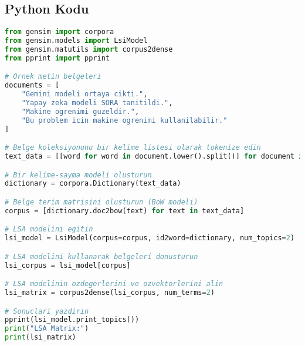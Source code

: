 \subsection{Python Kodu}

\begin{lstlisting}[language=Python]
from gensim import corpora
from gensim.models import LsiModel
from gensim.matutils import corpus2dense
from pprint import pprint

# Ornek metin belgeleri
documents = [
    "Gemini modeli ortaya cikti.",
    "Yapay zeka modeli SORA tanitildi.",
    "Makine ogrenimi guzeldir.",
    "Bu problem icin makine ogrenimi kullanilabilir."
]

# Belge koleksiyonunu bir kelime listesi olarak tokenize edin
text_data = [[word for word in document.lower().split()] for document in documents]

# Bir kelime-sayma modeli olusturun
dictionary = corpora.Dictionary(text_data)

# Belge terim matrisini olusturun (BoW modeli)
corpus = [dictionary.doc2bow(text) for text in text_data]

# LSA modelini egitin
lsi_model = LsiModel(corpus=corpus, id2word=dictionary, num_topics=2)

# LSA modelini kullanarak belgeleri donusturun
lsi_corpus = lsi_model[corpus]

# LSA modelinin ozdegerlerini ve ozvektorlerini alin
lsi_matrix = corpus2dense(lsi_corpus, num_terms=2)

# Sonuclari yazdirin
pprint(lsi_model.print_topics())
print("LSA Matrix:")
print(lsi_matrix)
\end{lstlisting}

\newpage
